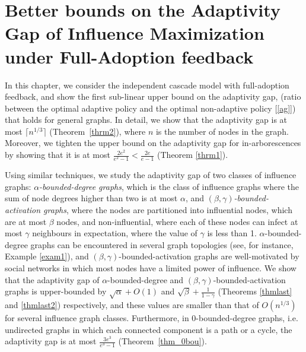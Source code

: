 

\chapter{Better bounds on the Adaptivity Gap of Influence Maximization under Full-Adoption feedback}\label{chap:background}


In this chapter, we consider the independent cascade model with full-adoption feedback, and show the first sub-linear upper bound on the adaptivity gap, (ratio between the optimal adaptive policy and the optimal non-adaptive policy [\ref{ag}]) that holds for general graphs. In detail, we show that the adaptivity gap is at most $\lceil n^{1/3}\rceil$ (Theorem~\ref{thrm2}), where $n$ is the number of nodes in the graph. Moreover, we tighten the upper bound on the adaptivity gap for in-arborescences by showing that it is at most $\frac{2e^2}{e^2-1}<\frac{2e}{e-1}$ (Theorem \ref{thrm1}).


Using similar techniques, we study the adaptivity gap of two classes of influence graphs: \emph{$\alpha$-bounded-degree graphs}, which is the class of influence graphs where the sum of node degrees higher than two is at most $\alpha$, and \emph{$(\beta,\gamma)$-bounded-activation graphs}, where the nodes are partitioned into influential nodes, which are at most $\beta$ nodes, and non-influential, where each of these nodes can infect at most $\gamma$ neighbours in expectation, where the value of $\gamma$ is less than 1. $\alpha$-bounded-degree graphs can be encountered in several graph topologies (see, for instance, Example \ref{exam1}), and $(\beta,\gamma)$-bounded-activation graphs are well-motivated by social networks in which most nodes have a limited power of influence. We show that the adaptivity gap of $\alpha$-bounded-degree and $(\beta,\gamma)$-bounded-activation graphs is upper-bounded by $\sqrt{\alpha}+O(1)$ and $\sqrt{\beta}+\frac{1}{1-\gamma}$ (Theorems \ref{thmlast} and \ref{thmlast2}) respectively, and these values are smaller than that of $O(n^{1/3})$ for several influence graph classes. Furthermore, in 0-bounded-degree graphs, i.e. undirected graphs in which each connected component is a path or a cycle, the adaptivity gap is at most $\frac{3e^3}{e^3-1}$ (Theorem~\ref{thm_0bou}). 
%

